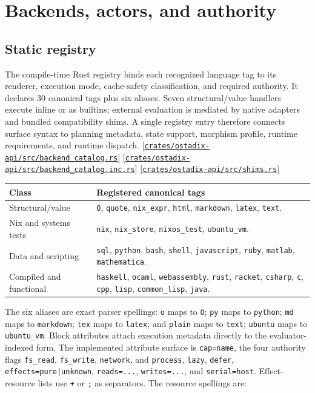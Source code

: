 \documentclass[11pt,oneside]{article}
\newcommand{\src}[1]{\textcolor{OSlate}{\scriptsize[\href{https://github.com/lostadi/OSTADIX/blob/c0b02c326b2329a95ba52447c7180bc93957cd57/#1}{\nolinkurl{#1}}]}\allowbreak}
\begin{document}
\section{Backends, actors, and authority}
\label{sec:backends}

\subsection{Static registry}

The compile-time Rust registry binds each recognized language tag to its
renderer, execution mode, cache-safety classification, and required authority.
It declares 30 canonical tags plus six aliases. Seven structural/value
handlers execute inline or as builtins; external evaluation is mediated by
native adapters and bundled compatibility shims. A single registry entry
therefore connects surface syntax to planning metadata, state support,
morphism profile, runtime requirements, and runtime dispatch.
\src{crates/ostadix-api/src/backend_catalog.rs}
\src{crates/ostadix-api/src/backend_catalog.inc.rs}
\src{crates/ostadix-api/src/shims.rs}

\begin{longtable}{P{0.21\textwidth} P{0.71\textwidth}}
\toprule
\textbf{Class} & \textbf{Registered canonical tags} \\
\midrule
\endhead
Structural/value &
\texttt{O}, \texttt{quote}, \texttt{nix\_expr}, \texttt{html},
\texttt{markdown}, \texttt{latex}, \texttt{text}. \\
Nix and systems tests &
\texttt{nix}, \texttt{nix\_store}, \texttt{nixos\_test},
\texttt{ubuntu\_vm}. \\
Data and scripting &
\texttt{sql}, \texttt{python}, \texttt{bash}, \texttt{shell},
\texttt{javascript}, \texttt{ruby}, \texttt{matlab},
\texttt{mathematica}. \\
Compiled and functional &
\texttt{haskell}, \texttt{ocaml}, \texttt{webassembly}, \texttt{rust},
\texttt{racket}, \texttt{csharp}, \texttt{c}, \texttt{cpp},
\texttt{lisp}, \texttt{common\_lisp}, \texttt{java}. \\
\bottomrule
\end{longtable}

The six aliases are exact parser spellings: \texttt{o} maps to \texttt{O};
\texttt{py} maps to \texttt{python}; \texttt{md} maps to
\texttt{markdown}; \texttt{tex} maps to \texttt{latex}; and
\texttt{plain} maps to \texttt{text}; \texttt{ubuntu} maps to
\texttt{ubuntu\_vm}. Block attributes attach execution
metadata directly to the evaluator-indexed form. The implemented attribute
surface is \texttt{cap=name}, the four authority flags \texttt{fs\_read},
\texttt{fs\_write}, \texttt{network}, and \texttt{process},
\texttt{lazy}, \texttt{defer},
\texttt{effects=pure|unknown}, \texttt{reads=...}, \texttt{writes=...}, and
\texttt{serial=host}. Effect-resource lists use \texttt{+} or \texttt{;} as
separators. The resource spellings are:
\end{document}
